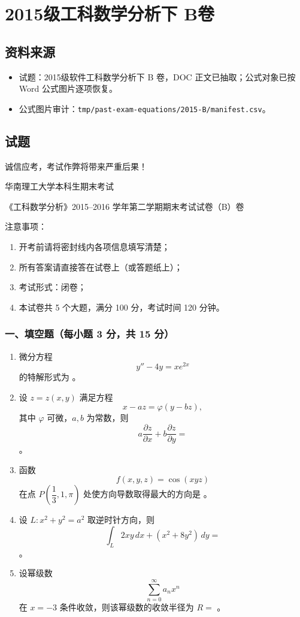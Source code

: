 \section{2015级工科数学分析下 B卷}

\subsection{资料来源}
\begin{itemize}
  \item 试题：2015级软件工科数学分析下 B 卷，DOC 正文已抽取；公式对象已按 Word 公式图片逐项恢复。
  \item 公式图片审计：\texttt{tmp/past-exam-equations/2015-B/manifest.csv}。
\end{itemize}

\subsection{试题}
诚信应考，考试作弊将带来严重后果！

华南理工大学本科生期末考试

《工科数学分析》2015--2016 学年第二学期期末考试试卷（B）卷

注意事项：
\begin{enumerate}
  \item 开考前请将密封线内各项信息填写清楚；
  \item 所有答案请直接答在试卷上（或答题纸上）；
  \item 考试形式：闭卷；
  \item 本试卷共 5 个大题，满分 100 分，考试时间 120 分钟。
\end{enumerate}

\subsubsection*{一、填空题（每小题 3 分，共 15 分）}
\begin{enumerate}
  \item 微分方程
  \[
  y''-4y=xe^{2x}
  \]
  的特解形式为 \underline{\hspace{4cm}}。
  \item 设 $z=z(x,y)$ 满足方程
  \[
  x-az=\varphi(y-bz),
  \]
  其中 $\varphi$ 可微，$a,b$ 为常数，则
  \[
  a\frac{\partial z}{\partial x}+b\frac{\partial z}{\partial y}=
  \]
  \underline{\hspace{3cm}}。
  \item 函数
  \[
    f(x,y,z)=\cos(xyz)
  \]
  在点 $P\!\left(\dfrac13,1,\pi\right)$ 处使方向导数取得最大的方向是 \underline{\hspace{4cm}}。
  \item 设 $L:x^2+y^2=a^2$ 取逆时针方向，则
  \[
  \int_L 2xy\,dx+(x^2+8y^2)\,dy=
  \]
  \underline{\hspace{3cm}}。
  \item 设幂级数
  \[
  \sum_{n=0}^{\infty}a_nx^n
  \]
  在 $x=-3$ 条件收敛，则该幂级数的收敛半径为 $R=$ \underline{\hspace{2cm}}。
\end{enumerate}


